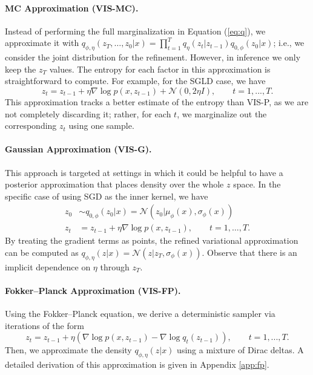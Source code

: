     \paragraph{MC Approximation (VIS-MC).}
     Instead of performing the full marginalization in Equation (\ref{eq:q}), we approximate it with  { $q_{\phi,\eta}(z_T,\ldots, z_0|x) = \prod_{t=1}^T q_\eta(z_t | z_{t-1}) q_{0,\phi}(z_0|x)$; i.e., we consider the joint distribution for the refinement. However, in inference we only keep the $z_T$ values}. The entropy for each factor in this 
    approximation is straightforward to compute. For 
    example, for the SGLD case, we have
    {\bf
    $$ 
    z_t = z_{t-1} + \eta \nabla \log p(x, z_{t-1}) + \mathcal{N}(0, 2\eta I),\qquad  t=1, ..., T.
    $$
    }
This approximation tracks a better estimate of the entropy than 
    VIS-P, as we are not completely discarding it; rather, for each $t$, we marginalize out the corresponding $z_t$ using one sample.
          \paragraph{Gaussian Approximation (VIS-G).} 
          This approach is targeted at settings in which it could be helpful to have a posterior approximation that places density over the whole
        $z$ space. In the specific case of using SGD as the inner kernel, we have
\begin{align*}
z_0 &\sim q_{0,\phi}(z_0|x) = \mathcal{N}(z_0 | \mu_\phi(x), \sigma_\phi(x))\\
z_t &= z_{t-1} + \eta \nabla \log p(x, z_{t-1}), \qquad t=1,\ldots,T.
\end{align*}
By treating the gradient terms as points, the refined variational approximation can be computed as
$ q_{\phi,\eta}(z|x) = \mathcal{N}(z | z_T, \sigma_\phi(x))$. Observe 
that there is an implicit dependence on $\eta$ through $z_T$.

    
      \paragraph{Fokker--Planck Approximation (VIS-FP).} 
      Using the Fokker--Planck equation, we derive 
    a deterministic sampler via iterations of the form
\begin{equation}\label{eq:fppp}
z_{t} = z_{t-1} + \eta (\nabla \log p(x, z_{t-1}) - \nabla \log q_t (z_{t-1})),\qquad  t=1, ..., T{.}
\end{equation}
Then, we approximate the density $q_{\phi,\eta}(z|x)$ using a mixture of Dirac deltas. A detailed derivation of this approximation is given in Appendix \ref{app:fp}. 


